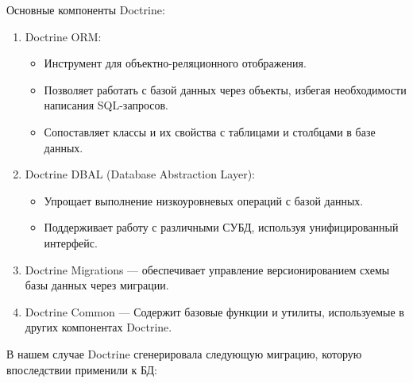 \documentclass[pract]{SCWorks}
\begin{document}
Основные компоненты Doctrine:
\begin{enumerate}
    \item Doctrine ORM:
    \begin{itemize}
        \item Инструмент для объектно-реляционного отображения.
        \item Позволяет работать с базой данных через объекты, избегая 
        необходимости написания SQL-запросов.
        \item Сопоставляет классы и их свойства с таблицами и столбцами в 
        базе данных.
    \end{itemize}
        
    \item Doctrine DBAL (Database Abstraction Layer):
    \begin{itemize}
        \item Упрощает выполнение низкоуровневых операций с базой данных.
        \item Поддерживает работу с различными СУБД, используя 
        унифицированный интерфейс.
    \end{itemize}
        
    \item Doctrine Migrations — обеспечивает управление версионированием 
    схемы базы данных через миграции.

    \item Doctrine Common — Содержит базовые функции и утилиты, используемые 
    в других компонентах Doctrine.

\end{enumerate}
    
В нашем случае Doctrine сгенерировала следующую миграцию, которую впоследствии
применили к БД:
\end{document}
